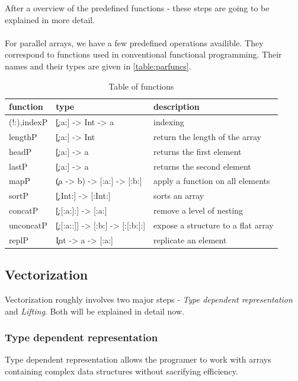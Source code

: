   After a overview of the predefined functions - these steps
  are going to be explained in more detail.
  
  \paragraph{}
    For parallel arrays, we have a few predefined operations availible.
    They correspond to functions used in conventional functional programming.
    Their names and their types are given in \ref{table:parfuncs}.
    
    \begin{table}[h]
      \caption{Table of functions}
      \label{table:parfuns}
      \begin{tabular}{lll}
          \toprule
          function & type & description \\
          \midrule
          (!:),indexP & \c{[:a:] -> Int -> a} & indexing \\
          lengthP & \c{[:a:] -> Int} & return the length of the array \\
          headP & \c{[:a:] -> a} & returns the first element\\
          lastP & \c{[:a:] -> a} & returns the second element \\
          mapP & \c{(a -> b) -> [:a:] -> [:b:]} & apply a function on all elements \\
          sortP & \c{[:Int:] -> [:Int:]} & sorts an array \\
          concatP & \c{[:[:a:]:] -> [:a:]} & remove a level of nesting \\
          unconcatP & \c{[:[:a::]] -> [:b:] -> [:[:b:]:]} & expose a structure to a flat array \\
          replP & \c{Int -> a -> [:a:]} & replicate an element \\
      \end{tabular}
    \end{table}

    
  \subsection{Vectorization}
    Vectorization roughly involves two major steps -
    \emph{Type dependent representation} and \emph{Lifting}.
    Both will be explained in detail now.
  
    \subsubsection{Type dependent representation}
      Type dependent representation 
      allows the programer to work with arrays containing complex
      data structures without sacrifying efficiency.
      

